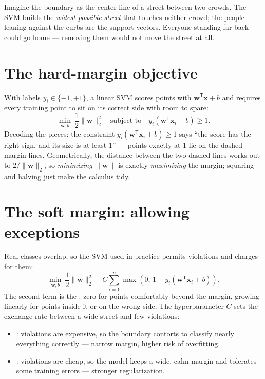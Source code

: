 \begin{intuition}
Imagine the boundary as the center line of a street between two crowds. The SVM builds the \emph{widest possible street} that touches neither crowd; the people leaning against the curbs are the support vectors. Everyone standing far back could go home --- removing them would not move the street at all.
\end{intuition}

\section{The hard-margin objective}

With labels $y_i\in\{-1,+1\}$, a linear SVM scores points with $\bm{w}^{\mathsf T}\bm{x}+b$ and requires every training point to sit on its correct side with room to spare:
\[
  \min_{\bm{w},b}\ \frac{1}{2}\|\bm{w}\|_2^2
  \quad\text{subject to}\quad
  y_i(\bm{w}^{\mathsf T}\bm{x}_i+b)\geq 1 .
\]
Decoding the pieces: the constraint $y_i(\bm{w}^{\mathsf T}\bm{x}_i+b)\geq 1$ says ``the score has the right sign, and its size is at least 1'' --- points exactly at 1 lie on the dashed margin lines. Geometrically, the distance between the two dashed lines works out to $2/\|\bm{w}\|_2$, so \emph{minimizing} $\|\bm{w}\|$ is exactly \emph{maximizing} the margin; squaring and halving just make the calculus tidy.

\section{The soft margin: allowing exceptions}

Real classes overlap, so the SVM used in practice permits violations and charges for them:
\[
  \min_{\bm{w},b}\
  \frac{1}{2}\|\bm{w}\|_2^2
  +C\sum_{i=1}^{n}
  \max\!\left(0,\,1-y_i(\bm{w}^{\mathsf T}\bm{x}_i+b)\right).
\]
The second term is the : zero for points comfortably beyond the margin, growing linearly for points inside it or on the wrong side. The hyperparameter $C$ sets the exchange rate between a wide street and few violations:

\begin{itemize}
  \item {}: violations are expensive, so the boundary contorts to classify nearly everything correctly --- narrow margin, higher risk of overfitting.
  \item \term{Small $C$}: violations are cheap, so the model keeps a wide, calm margin and tolerates some training errors --- stronger regularization.
\end{itemize}

